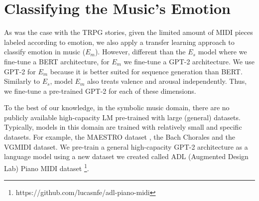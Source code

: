 

\section{Classifying the Music's Emotion}


As was the case with the TRPG stories, given the limited amount of MIDI pieces
labeled according to emotion, we also apply a transfer
learning approach to classify emotion in music ($E_m$).
However, different than the $E_s$ model
where we fine-tune a BERT architecture, for $E_m$ we fine-tune a GPT-2 architecture\cite{radford2019language}.
We use GPT-2 for $E_m$ because it is better suited for sequence generation than BERT.
Similarly to $E_s$, model $E_m$ also treats valence and arousal independently.
Thus, we fine-tune a pre-trained GPT-2 for each of these
dimensions.

To the best of our knowledge, in the symbolic music domain, there are no publicly available high-capacity LM pre-trained with large (general) datasets. Typically, models in this domain are trained with relatively small and specific datasets. For example, the MAESTRO dataset \cite{hawthorne2018enabling}, the Bach Chorales \cite{hadjeres2017deepbach} and the VGMIDI \cite{ferreira_2019} dataset. We pre-train a general high-capacity GPT-2 architecture as a language model \cite{radford2019language} using a new dataset we created called ADL (Augmented Design Lab) Piano MIDI dataset \footnote{https://github.com/lucasnfe/adl-piano-midi}.


